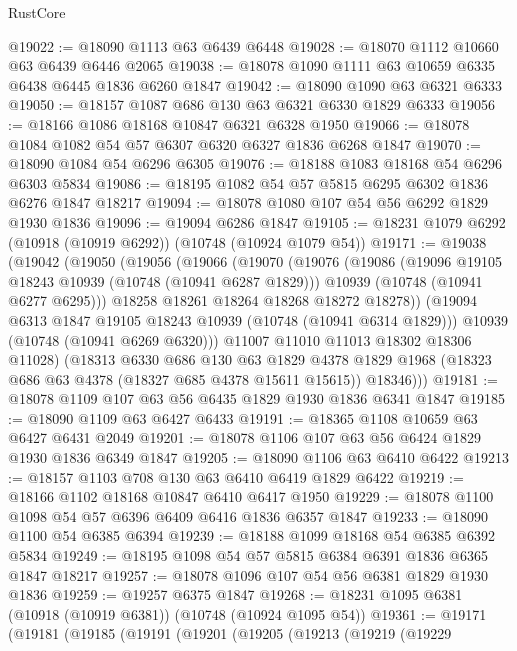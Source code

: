 \begin{lexlean}{RustCore}
\begin{coremodule}
@19022 := @18090 @1113 @63 @6439 @6448
@19028 := @18070 @1112 @10660 @63 @6439 @6446 @2065
@19038 := @18078 @1090 @1111 @63 @10659 @6335 @6438 @6445 @1836 @6260 @1847
@19042 := @18090 @1090 @63 @6321 @6333
@19050 := @18157 @1087 @686 @130 @63 @6321 @6330 @1829 @6333
@19056 := @18166 @1086 @18168 @10847 @6321 @6328 @1950
@19066 := @18078 @1084 @1082 @54 @57 @6307 @6320 @6327 @1836 @6268 @1847
@19070 := @18090 @1084 @54 @6296 @6305
@19076 := @18188 @1083 @18168 @54 @6296 @6303 @5834
@19086 := @18195 @1082 @54 @57 @5815 @6295 @6302 @1836 @6276 @1847 @18217
@19094 := @18078 @1080 @107 @54 @56 @6292 @1829 @1930 @1836
@19096 := @19094 @6286 @1847
@19105 := @18231 @1079 @6292 (@10918 (@10919 @6292)) (@10748 (@10924 @1079 @54))
@19171 := @19038
    (@19042
      (@19050
        (@19056
          (@19066
            (@19070
              (@19076
                (@19086
                  (@19096 @19105 @18243 @10939 (@10748 (@10941 @6287 @1829)))
                  @10939
                  (@10748 (@10941 @6277 @6295)))
                @18258
                @18261
                @18264
                @18268
                @18272
                @18278))
            (@19094 @6313 @1847 @19105 @18243 @10939 (@10748 (@10941 @6314 @1829)))
            @10939
            (@10748 (@10941 @6269 @6320)))
          @11007
          @11010
          @11013
          @18302
          @18306
          @11028)
        (@18313
          @6330
          @686
          @130
          @63
          @1829
          @4378
          @1829
          @1968
          (@18323 @686 @63 @4378 (@18327 @685 @4378 @15611 @15615))
          @18346)))
@19181 := @18078 @1109 @107 @63 @56 @6435 @1829 @1930 @1836 @6341 @1847
@19185 := @18090 @1109 @63 @6427 @6433
@19191 := @18365 @1108 @10659 @63 @6427 @6431 @2049
@19201 := @18078 @1106 @107 @63 @56 @6424 @1829 @1930 @1836 @6349 @1847
@19205 := @18090 @1106 @63 @6410 @6422
@19213 := @18157 @1103 @708 @130 @63 @6410 @6419 @1829 @6422
@19219 := @18166 @1102 @18168 @10847 @6410 @6417 @1950
@19229 := @18078 @1100 @1098 @54 @57 @6396 @6409 @6416 @1836 @6357 @1847
@19233 := @18090 @1100 @54 @6385 @6394
@19239 := @18188 @1099 @18168 @54 @6385 @6392 @5834
@19249 := @18195 @1098 @54 @57 @5815 @6384 @6391 @1836 @6365 @1847 @18217
@19257 := @18078 @1096 @107 @54 @56 @6381 @1829 @1930 @1836
@19259 := @19257 @6375 @1847
@19268 := @18231 @1095 @6381 (@10918 (@10919 @6381)) (@10748 (@10924 @1095 @54))
@19361 := @19171
    (@19181
      (@19185
        (@19191
          (@19201
            (@19205
              (@19213
                (@19219
                  (@19229

\end{coremodule}
\end{lexlean}
